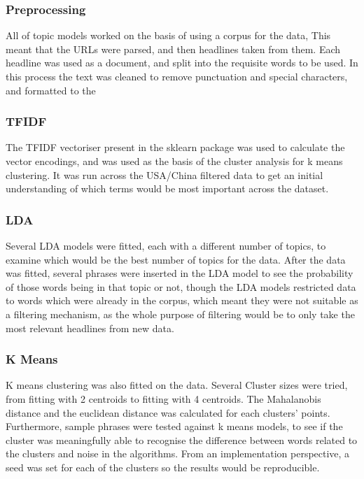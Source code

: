 \subsubsection{Preprocessing}
All of topic models worked on the basis of using a corpus for the data, This meant that the URLs were parsed, and then headlines taken from them. Each headline was used as a document, and split into the requisite words to be used. In this process the text was cleaned to remove punctuation and special characters, and formatted to the 
\subsubsection{TFIDF}
The TFIDF vectoriser present in the sklearn package was used to calculate the vector encodings, and was used as the basis of the cluster analysis for k means clustering. It was run across the USA/China filtered data to get an initial understanding of which terms would be most important across the dataset.

\subsubsection{LDA}
Several LDA models were fitted, each with a different number of topics, to examine which would be the best number of topics for the data. After the data was fitted, several phrases were inserted in the LDA model to see the probability of those words being in that topic or not, though the LDA models restricted data to words which were already in the corpus, which meant they were not suitable as a filtering mechanism, as the whole purpose of filtering would be to only take the most relevant headlines from new data.

\subsubsection{K Means}
K means clustering was also fitted on the data. Several Cluster sizes were tried, from fitting with 2 centroids to fitting with 4 centroids. The Mahalanobis distance and the euclidean distance was calculated for each clusters' points. Furthermore, sample phrases were tested against k means models, to see if the cluster was meaningfully able to recognise the difference between words related to the clusters and noise in the algorithms. From an implementation perspective, a seed was set for each of the clusters so the results would be reproducible. 
